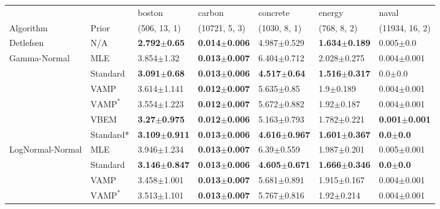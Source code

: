 \begin{tabular}{lllllll}
\toprule
                 &      &                    boston &                    carbon &                  concrete &                    energy &                     naval \\
Algorithm & Prior& (506, 13, 1)& (10721, 5, 3)& (1030, 8, 1)& (768, 8, 2)& (11934, 16, 2)\\
\midrule
Detlefsen & N/A &   \textbf{2.792$\pm$0.65} &  \textbf{0.014$\pm$0.006} &           4.987$\pm$0.529 &  \textbf{1.634$\pm$0.189} &             0.005$\pm$0.0 \\
Gamma-Normal & MLE &            3.854$\pm$1.32 &  \textbf{0.013$\pm$0.007} &           6.404$\pm$0.712 &           2.028$\pm$0.275 &           0.004$\pm$0.001 \\
                 & Standard &   \textbf{3.091$\pm$0.68} &  \textbf{0.013$\pm$0.006} &   \textbf{4.517$\pm$0.64} &  \textbf{1.516$\pm$0.317} &               0.0$\pm$0.0 \\
                 & VAMP &           3.614$\pm$1.141 &  \textbf{0.012$\pm$0.007} &            5.635$\pm$0.85 &             1.9$\pm$0.189 &           0.004$\pm$0.001 \\
                 & $\text{VAMP}^*$ &           3.554$\pm$1.223 &  \textbf{0.012$\pm$0.007} &           5.672$\pm$0.882 &            1.92$\pm$0.187 &           0.004$\pm$0.001 \\
                 & VBEM &   \textbf{3.27$\pm$0.975} &  \textbf{0.012$\pm$0.006} &           5.163$\pm$0.793 &           1.782$\pm$0.221 &  \textbf{0.001$\pm$0.001} \\
                 & Standard* &  \textbf{3.109$\pm$0.911} &  \textbf{0.013$\pm$0.006} &  \textbf{4.616$\pm$0.967} &  \textbf{1.601$\pm$0.367} &      \textbf{0.0$\pm$0.0} \\
LogNormal-Normal & MLE &           3.946$\pm$1.234 &  \textbf{0.013$\pm$0.007} &            6.39$\pm$0.559 &           1.987$\pm$0.201 &           0.005$\pm$0.001 \\
                 & Standard &  \textbf{3.146$\pm$0.847} &  \textbf{0.013$\pm$0.006} &  \textbf{4.605$\pm$0.671} &  \textbf{1.666$\pm$0.346} &      \textbf{0.0$\pm$0.0} \\
                 & VAMP &           3.458$\pm$1.001 &  \textbf{0.013$\pm$0.007} &           5.681$\pm$0.891 &           1.915$\pm$0.167 &           0.004$\pm$0.001 \\
                 & $\text{VAMP}^*$ &           3.513$\pm$1.101 &  \textbf{0.013$\pm$0.007} &           5.767$\pm$0.816 &            1.92$\pm$0.214 &           0.004$\pm$0.001 \\

\end{tabular}
